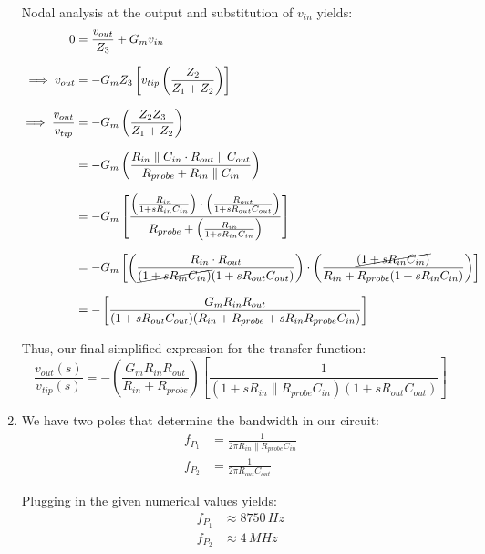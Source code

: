 \documentclass[12pt, fleqn]{article}
\begin{document}
\begin{enumerate}[label=(\roman*)]
{    Nodal analysis at the output and substitution of $v_{in}$ yields:
    \begin{align*}
        0 &= \frac{v_{out}}{Z_3} + G_m v_{in}\\[0.25cm]
        \implies  v_{out} &= - G_m Z_3 \left[v_{tip}\left(\frac{Z_2}{Z_1 + Z_2}\right)\right]\\[0.25cm]
        \implies  \frac{v_{out}}{v_{tip}} &= - G_m\left(\frac{Z_2 Z_3}{Z_1 + Z_2}\right)\\[0.25cm]
        &= - G_m\left(\frac{R_{in} \parallel C_{in} \cdot R_{out} \parallel C_{out}}{R_{probe} + R_{in} \parallel C_{in}}\right)\\[0.25cm]
        &= - G_m\left[\frac{\left(\frac{R_{in}}{1 + s R_{in} C_{in}}\right) \cdot \left(\frac{R_{out}}{1 + s R_{out} C_{out}}\right)}
                {R_{probe} + \left(\frac{R_{in}}{1 + s R_{in} C_{in}}\right)}\right]\\[0.25cm]
        &= - G_m\left[\left(\frac{R_{in} \cdot R_{out}}{\cancel{(1 + s R_{in} C_{in})}(1 + s R_{out} C_{out})}\right)
                    \cdot \left(\frac{\cancel{(1 + s R_{in} C_{in})}}{R_{in} + R_{probe}(1 + s R_{in} C_{in})}\right)\right]\\[0.25cm]
        &= -\left[\frac{G_m R_{in} R_{out}}{(1 + s R_{out} C_{out})(R_{in} + R_{probe} + s R_{in} R_{probe} C_{in})}\right]
    \end{align*}

    Thus, our final simplified expression for the transfer function:
    \begin{equation}
        \boxed{\frac{v_{out}(s)}{v_{tip}(s)} = -\left(\frac{G_m R_{in} R_{out}}{R_{in} + R_{probe}}\right)\left[\frac{1}{(1 + s R_{in} \parallel R_{probe} C_{in})(1 + s R_{out} C_{out})}\right]}
    \end{equation}
    }
    \item
    {
    We have two poles that determine the bandwidth in our circuit:
    \begin{align}
        f_{P_1} &= \frac{1}{2\pi R_{in} \parallel R_{probe} C_{in}}\\[0.25cm]
        f_{P_2} &= \frac{1}{2\pi R_{out} C_{out}}
    \end{align}
    
    Plugging in the given numerical values yields:
    \begin{align}
        f_{P_1} &\approx 8750\,Hz\\[0.25cm]
        f_{P_2} &\approx 4\,MHz
    \end{align}
    
}
\end{enumerate}
\end{document}
